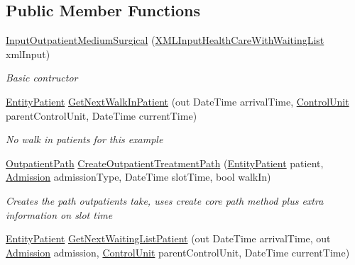 \subsection*{Public Member Functions}
\begin{DoxyCompactItemize}
\item 
\hyperlink{class_sample_hospital_model_1_1_outpatient_1_1_input_outpatient_medium_surgical_a2c1c6790c0e94a5442c578f6289a032e}{Input\+Outpatient\+Medium\+Surgical} (\hyperlink{class_general_health_care_elements_1_1_input_1_1_x_m_l_input_health_care_with_waiting_list}{X\+M\+L\+Input\+Health\+Care\+With\+Waiting\+List} xml\+Input)
\begin{DoxyCompactList}\small\item\em Basic contructor \end{DoxyCompactList}\item 
\hyperlink{class_general_health_care_elements_1_1_entities_1_1_entity_patient}{Entity\+Patient} \hyperlink{class_sample_hospital_model_1_1_outpatient_1_1_input_outpatient_medium_surgical_adebb3bc9d11006fb7db6b60017d28f62}{Get\+Next\+Walk\+In\+Patient} (out Date\+Time arrival\+Time, \hyperlink{class_simulation_core_1_1_h_c_c_m_elements_1_1_control_unit}{Control\+Unit} parent\+Control\+Unit, Date\+Time current\+Time)
\begin{DoxyCompactList}\small\item\em No walk in patients for this example \end{DoxyCompactList}\item 
\hyperlink{class_general_health_care_elements_1_1_department_models_1_1_outpatient_1_1_outpatient_path}{Outpatient\+Path} \hyperlink{class_sample_hospital_model_1_1_outpatient_1_1_input_outpatient_medium_surgical_ae39ad7d8453527939bfff59f3f9f4767}{Create\+Outpatient\+Treatment\+Path} (\hyperlink{class_general_health_care_elements_1_1_entities_1_1_entity_patient}{Entity\+Patient} patient, \hyperlink{class_general_health_care_elements_1_1_treatment_admission_types_1_1_admission}{Admission} admission\+Type, Date\+Time slot\+Time, bool walk\+In)
\begin{DoxyCompactList}\small\item\em Creates the path outpatients take, uses create core path method plus extra information on slot time \end{DoxyCompactList}\item 
\hyperlink{class_general_health_care_elements_1_1_entities_1_1_entity_patient}{Entity\+Patient} \hyperlink{class_sample_hospital_model_1_1_outpatient_1_1_input_outpatient_medium_surgical_a03d26d3cc654b8b9665b9a1ca855b81f}{Get\+Next\+Waiting\+List\+Patient} (out Date\+Time arrival\+Time, out \hyperlink{class_general_health_care_elements_1_1_treatment_admission_types_1_1_admission}{Admission} admission, \hyperlink{class_simulation_core_1_1_h_c_c_m_elements_1_1_control_unit}{Control\+Unit} parent\+Control\+Unit, Date\+Time current\+Time)

\end{DoxyCompactItemize}
